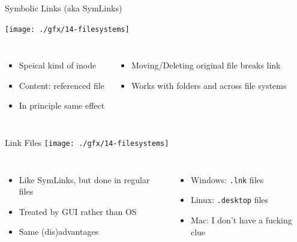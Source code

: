 
\begin{frame}{Symbolic Links (aka SymLinks)}
%
\vspace{-6pt}
\begin{center}
\texttt{[image: ./gfx/14-filesystems]}
\end{center}
%
\vspace{-12pt}
\begin{columns}
	\begin{itemize}
	\item Speical kind of inode
	\item Content: referenced file
	\item In principle same effect
	\end{itemize}
%
	\begin{itemize}
	\item Moving/Deleting original file breaks link
	\item Works with folders and across file systems
	\end{itemize}
\end{columns}
%
\end{frame}


\begin{frame}{Link Files}
%
\texttt{[image: ./gfx/14-filesystems]}
%
\begin{columns}
	\begin{itemize}
	\item Like SymLinks, but done in regular files
	\item Treated by GUI rather than OS
	\item Same (dis)advantages
	\end{itemize}
%
	\begin{itemize}
	\item Windows: \texttt{.lnk} files
	\item Linux: \texttt{.desktop} files
	\item Mac: I don't have a fucking clue
	\end{itemize}
\end{columns}
%
\end{frame}


